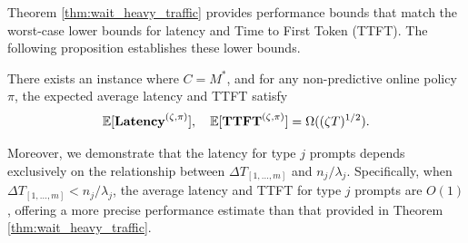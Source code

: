 Theorem \ref{thm:wait_heavy_traffic} provides performance bounds that match the worst-case lower bounds for latency and Time to First Token (TTFT). The following proposition establishes these lower bounds.
\begin{proposition}\label{prop::simple random walk, tight bound}
There exists an instance where \( C = M^* \), and for any non-predictive online policy \(\pi\), the expected average latency and TTFT satisfy
\[
\mathbb{E}[\textbf{Latency}^{(\zeta,\pi)}],\quad \mathbb{E}[\textbf{TTFT}^{(\zeta,\pi)}] = \Omega((\zeta T)^{1/2}).
\]
\end{proposition}
Moreover, we demonstrate that the latency for type \( j \) prompts depends exclusively on the relationship between \(\Delta T_{[1,\dots,m]}\) and $n_j/\lambda_j$. Specifically, when \(\Delta T_{[1,\dots,m]} < n_j/\lambda_j\), the average latency and TTFT for type \( j \) prompts are \( O(1) \), offering a more precise performance estimate than that provided in Theorem \ref{thm:wait_heavy_traffic}.





